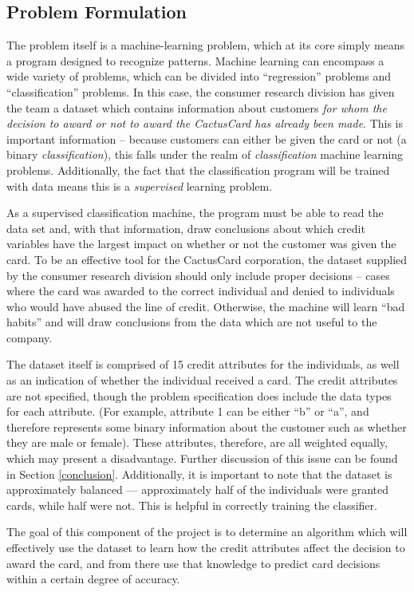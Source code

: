 \documentclass[11pt,journal]{IEEEtran}
\begin{document}
\subsection{Problem Formulation}
The problem itself is a machine-learning problem, which at its core simply means a program designed to recognize patterns. Machine learning can encompass a wide variety of problems, which can be divided into ``regression'' problems and ``classification'' problems. In this case, the consumer research division has given the team a dataset which contains information about customers \emph{for whom the decision to award or not to award the CactusCard has already been made}. This is important information -- because customers can either be given the card or not (a binary \emph{classification}), this falls under the realm of \emph{classification} machine learning problems. Additionally, the fact that the classification program will be trained with data means this is a \emph{supervised} learning problem.
\par
As a supervised classification machine, the program must be able to read the data set and, with that information, draw conclusions about which credit variables have the largest impact on whether or not the customer was given the card. To be an effective tool for the CactusCard corporation, the dataset supplied by the consumer research division should only include proper decisions -- cases where the card was awarded to the correct individual and denied to individuals who would have abused the line of credit. Otherwise, the machine will learn ``bad habits'' and will draw conclusions from the data which are not useful to the company.
\par
The dataset itself is comprised of 15 credit attributes for the individuals, as well as an indication of whether the individual received a card. The credit attributes are not specified, though the problem specification does include the data types for each attribute. (For example, attribute 1 can be either ``b'' or ``a'', and therefore represents some binary information about the customer such as whether they are male or female). These attributes, therefore, are all weighted equally, which may present a disadvantage. Further discussion of this issue can be found in Section \ref{conclusion}. Additionally, it is important to note that the dataset is approximately balanced --- approximately half of the individuals were granted cards, while half were not. This is helpful in correctly training the classifier.
\par
The goal of this component of the project is to determine an algorithm which will effectively use the dataset to learn how the credit attributes affect the decision to award the card, and from there use that knowledge to predict card decisions within a certain degree of accuracy.
\end{document}

